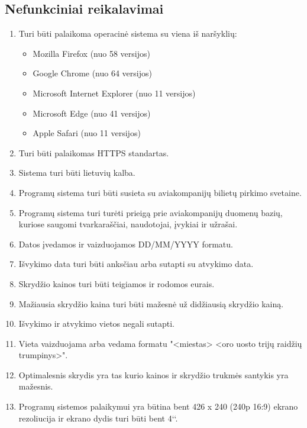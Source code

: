 \documentclass{VUMIFPSkursinis}
\begin{document}
            \subsection{Nefunkciniai reikalavimai}
                \begin{enumerate}[label=\textbf{NFR\arabic*}.]
                    \item Turi būti palaikoma operacinė sistema su viena iš naršyklių:
                    \begin{itemize}
                        \item Mozilla Firefox (nuo 58 versijos)
                        \item Google Chrome (nuo 64 versijos)
                        \item Microsoft Internet Explorer (nuo 11 versijos)
                        \item Microsoft Edge (nuo 41 versijos)
                        \item Apple Safari (nuo 11 versijos)
                    \end{itemize}
                    \item Turi būti palaikomas HTTPS standartas.
					\item Sistema turi būti lietuvių kalba.
                    \item Programų sistema turi būti susieta su aviakompanijų bilietų pirkimo svetaine.
                    \item Programų sistema turi turėti prieigą prie aviakompanijų duomenų bazių, kuriose saugomi tvarkaraščiai, naudotojai, įvykiai ir užrašai.
                    \item Datos įvedamos ir vaizduojamos DD/MM/YYYY formatu.
                    \item Išvykimo data turi būti anksčiau arba sutapti su atvykimo data.
                    \item Skrydžio kainos turi būti teigiamos ir rodomos eurais.
                    \item Mažiausia skrydžio kaina turi būti mažesnė už didžiausią skrydžio kainą.
                    \item Išvykimo ir atvykimo vietos negali sutapti.
                    \item Vieta vaizduojama arba vedama formatu "<miestas> <oro uosto trijų raidžių trumpinys>".
                    \item \label{optimal} Optimalesnis skrydis yra tas kurio kainos ir skrydžio trukmės santykis yra mažesnis.
                    \item Programų sistemos palaikymui yra būtina bent 426 x 240 (240p 16:9) ekrano rezoliucija ir ekrano dydis turi būti bent 4‘‘.

\end{enumerate}
\end{document}

